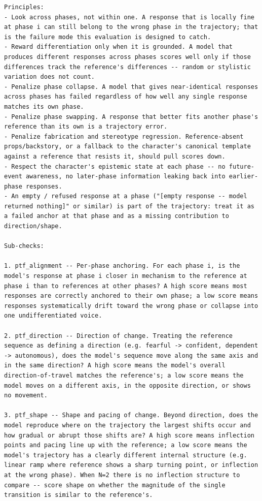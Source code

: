 \documentclass[11pt]{article}
\begin{document}
\begin{table}[htbp]
\begin{lstlisting}[basicstyle=\ttfamily\scriptsize]
Principles:
- Look across phases, not within one. A response that is locally fine at phase i can still belong to the wrong phase in the trajectory; that is the failure mode this evaluation is designed to catch.
- Reward differentiation only when it is grounded. A model that produces different responses across phases scores well only if those differences track the reference's differences -- random or stylistic variation does not count.
- Penalize phase collapse. A model that gives near-identical responses across phases has failed regardless of how well any single response matches its own phase.
- Penalize phase swapping. A response that better fits another phase's reference than its own is a trajectory error.
- Penalize fabrication and stereotype regression. Reference-absent props/backstory, or a fallback to the character's canonical template against a reference that resists it, should pull scores down.
- Respect the character's epistemic state at each phase -- no future- event awareness, no later-phase information leaking back into earlier-phase responses.
- An empty / refused response at a phase ("[empty response -- model returned nothing]" or similar) is part of the trajectory: treat it as a failed anchor at that phase and as a missing contribution to direction/shape.

Sub-checks:

1. ptf_alignment -- Per-phase anchoring. For each phase i, is the model's response at phase i closer in mechanism to the reference at phase i than to references at other phases? A high score means most responses are correctly anchored to their own phase; a low score means responses systematically drift toward the wrong phase or collapse into one undifferentiated voice.

2. ptf_direction -- Direction of change. Treating the reference sequence as defining a direction (e.g. fearful -> confident, dependent -> autonomous), does the model's sequence move along the same axis and in the same direction? A high score means the model's overall direction-of-travel matches the reference's; a low score means the model moves on a different axis, in the opposite direction, or shows no movement.

3. ptf_shape -- Shape and pacing of change. Beyond direction, does the model reproduce where on the trajectory the largest shifts occur and how gradual or abrupt those shifts are? A high score means inflection points and pacing line up with the reference; a low score means the model's trajectory has a clearly different internal structure (e.g. linear ramp where reference shows a sharp turning point, or inflection at the wrong phase). When N=2 there is no inflection structure to compare -- score shape on whether the magnitude of the single transition is similar to the reference's.


\end{lstlisting}
\end{table}
\end{document}
